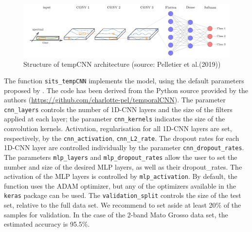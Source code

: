 \documentclass[a4paper,]{tufte-book}
\begin{document}
\begin{figure}

{\centering \includegraphics[width=0.8\linewidth,height=0.8\textheight]{images/tempcnn} 

}

\caption[Structure of tempCNN architecture (source]{Structure of tempCNN architecture (source: Pelletier et al.(2019))}\label{fig:unnamed-chunk-58}
\end{figure}

The function \texttt{sits\_tempCNN} implements the model, using the default parameters proposed by \citet{Pelletier2019}. The code has been derived from the Python source provided by the authors (\url{https://github.com/charlotte-pel/temporalCNN}). The parameter \texttt{cnn\_layers} controls the number of 1D-CNN layers and the size of the filters applied at each layer; the parameter \texttt{cnn\_kernels} indicates the size of the convolution kernels. Activation, regularisation for all 1D-CNN layers are set, respectively, by the \texttt{cnn\_activation}, \texttt{cnn\_L2\_rate}. The dropout rates for each 1D-CNN layer are controlled individually by the parameter \texttt{cnn\_dropout\_rates}. The parameters \texttt{mlp\_layers} and \texttt{mlp\_dropout\_rates} allow the user to set the number and size of the desired MLP layers, as well as their dropout\_rates. The activation of the MLP layers is controlled by \texttt{mlp\_activation}. By default, the function uses the ADAM optimizer, but any of the optimizers available in the \texttt{keras} package can be used. The \texttt{validation\_split} controls the size of the test set, relative to the full data set. We recommend to set aside at least 20\% of the samples for validation. In the case of the 2-band Mato Grosso data set, the estimated accuracy is 95.5\%.
\end{document}
